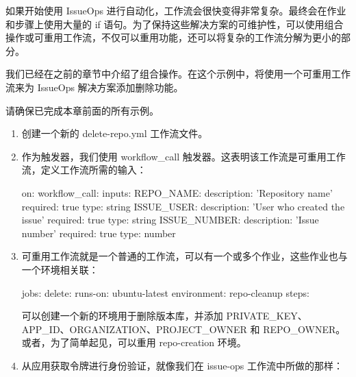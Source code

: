如果开始使用 IssueOps 进行自动化，工作流会很快变得非常复杂。最终会在作业和步骤上使用大量的 if 语句。为了保持这些解决方案的可维护性，可以使用组合操作或可重用工作流，不仅可以重用功能，还可以将复杂的工作流分解为更小的部分。

我们已经在之前的章节中介绍了组合操作。在这个示例中，将使用一个可重用工作流来为 IssueOps 解决方案添加删除功能。


请确保已完成本章前面的所有示例。


\begin{enumerate}
\item 
创建一个新的 delete-repo.yml 工作流文件。

\item 
作为触发器，我们使用 workflow\_call 触发器。这表明该工作流是可重用工作流，定义工作流所需的输入：

\begin{shell}
on:
  workflow_call:
    inputs:
      REPO_NAME:
        description: 'Repository name'
        required: true
        type: string
      ISSUE_USER:
        description: 'User who created the issue'
        required: true
        type: string
      ISSUE_NUMBER:
        description: 'Issue number'
        required: true
        type: number
\end{shell}

\item 
可重用工作流就是一个普通的工作流，可以有一个或多个作业，这些作业也与一个环境相关联：

\begin{shell}
  jobs:
    delete:
      runs-on: ubuntu-latest
      environment: repo-cleanup
      steps:
\end{shell}

可以创建一个新的环境用于删除版本库，并添加 PRIVATE\_KEY、APP\_ID、ORGANIZATION、PROJECT\_OWNER 和 REPO\_OWNER。或者，为了简单起见，可以重用 repo-creation 环境。

\item 
从应用获取令牌进行身份验证，就像我们在 issue-ops 工作流中所做的那样：



\end{enumerate}
